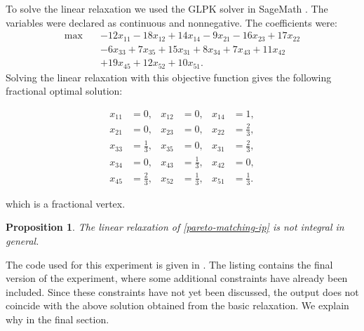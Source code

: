 \documentclass[12pt]{report}
\newtheorem{pprop}[base]{Proposition}
\numberwithin{algorithm}{chapter}
\begin{document}
 	To solve the linear relaxation we used the GLPK solver in SageMath \cite{sagemathGLPK}. The variables were declared as continuous and nonnegative. The coefficients were:
	\[
	\begin{aligned}
		\max \quad
		& -12x_{11}-18x_{12}+14x_{14}
		-9x_{21}-16x_{23}+17x_{22} \\
		& -6x_{33}+7x_{35}+15x_{31}+8x_{34}
		+7x_{43}+11x_{42} \\
		& +19x_{45}+12x_{52}+10x_{51}.
	\end{aligned}
	\]
	Solving the linear relaxation with this objective function gives the following
	fractional optimal solution:
	
	\begin{equation} \label{first-fractional-solution}
		\begin{aligned}
			x_{11}&=0, &
			x_{12}&=0, &
			x_{14}&=1, \\
			x_{21}&=0, &
			x_{23}&=0, &
			x_{22}&=\frac{2}{3}, \\
			x_{33}&=\frac{1}{3}, &
			x_{35}&=0, &
			x_{31}&=\frac{2}{3}, \\
			x_{34}&=0, &
			x_{43}&=\frac{1}{3}, &
			x_{42}&=0, \\
			x_{45}&=\frac{2}{3}, &
			x_{52}&=\frac{1}{3}, &
			x_{51}&=\frac{1}{3}.
		\end{aligned}
	\end{equation}

	which is a fractional vertex.
	
	\begin{pprop}
		\label{prop:pareto-relaxation-not-integral}
		The linear relaxation of \eqref{pareto-matching-ip} is not integral in general.
	\end{pprop}
	
	The code used for this experiment is given in . The listing contains the final version of the experiment, where some additional constraints have already been included. Since these constraints have not yet been discussed, the output does not coincide with the above solution obtained from the basic relaxation. We explain why in the final section.
	
\end{document}
